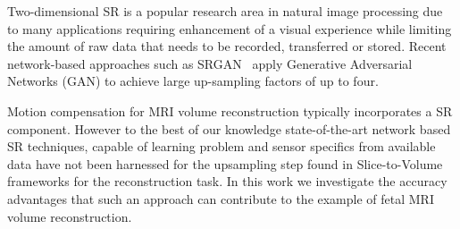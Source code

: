 \documentclass[runningheads,a4paper]{llncs}
\newcommand{\todo}[1]{}
\renewcommand{\todo}[1]{{\color{red} TODO: {#1}}}
\begin{document}
Two-dimensional SR is a popular research area in natural image processing due to many applications requiring enhancement of a visual experience while limiting the amount of raw data that needs to be recorded, transferred or stored. Recent network-based approaches such as SRGAN~\cite{Ledig2016} %
apply Generative Adversarial Networks (GAN) %
to achieve large up-sampling factors of up to four. %




Motion compensation for MRI volume reconstruction typically incorporates a SR component. However to the best of our knowledge state-of-the-art network based SR techniques, capable of learning problem and sensor specifics from available data have not been harnessed for the upsampling step found in Slice-to-Volume frameworks for the reconstruction task. In this work we investigate the accuracy advantages that such an approach can contribute to the example of fetal MRI volume reconstruction. 
\end{document}
